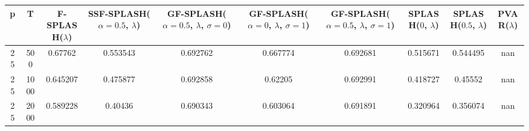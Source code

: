 \begin{tabular}{cccccccccc}
\hline
  p  &  T   &  F-SPLASH($\lambda$)  &  SSF-SPLASH($\alpha=0.5$, $\lambda$)  &  GF-SPLASH($\alpha=0.5$, $\lambda$, $\sigma=0$)  &  GF-SPLASH($\alpha=0$, $\lambda$, $\sigma=1$)  &  GF-SPLASH($\alpha=0.5$, $\lambda$, $\sigma=1$)  &  SPLASH($0$, $\lambda$)  &  SPLASH($0.5$, $\lambda$)  &  PVAR($\lambda$)  \\
\hline
 25  & 500  &        0.67762        &               0.553543                &                     0.692762                     &                    0.667774                    &                     0.692681                     &         0.515671         &          0.544495          &        nan        \\
 25  & 1000 &       0.645207        &               0.475877                &                     0.692858                     &                    0.62205                     &                     0.692991                     &         0.418727         &          0.45552           &        nan        \\
 25  & 2000 &       0.589228        &                0.40436                &                     0.690343                     &                    0.603064                    &                     0.691891                     &         0.320964         &          0.356074          &        nan        \\
\hline
\end{tabular}